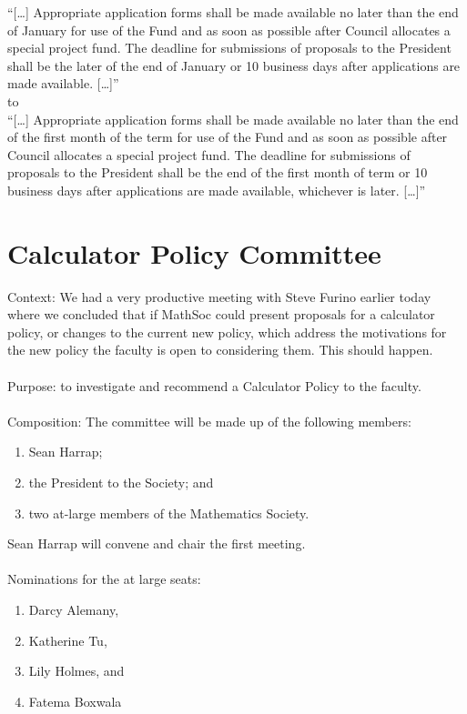\documentclass[12pt, letterpaper]{article}
\begin{document}
“[…] Appropriate application forms shall be made available no later than the end of January for use of the Fund and as soon as possible after Council allocates a special project fund. The deadline for submissions of proposals to the President shall be the later of the end of January or 10 business days after applications are made available. […]”\\

to\\

“[…] Appropriate application forms shall be made available no later than the end of the first month of the term for use of the Fund and as soon as possible after Council allocates a special project fund. The deadline for submissions of proposals to the President shall be the end of the first month of term or 10 business days after applications are made available, whichever is later. […]”\\

\newpage
{}
\section*{Calculator Policy Committee}
Context: We had a very productive meeting with Steve Furino earlier today where we concluded that if MathSoc could present proposals for a calculator policy, or changes to the current new policy, which address the motivations for the new policy the faculty is open to considering them. This should happen.\\\\
Purpose: to investigate and recommend a Calculator Policy to the faculty. \\\\
Composition: The committee will be made up of the following members:
\begin{enumerate}
	\item Sean Harrap;
	\item the President to the Society; and
	\item two at-large members of the Mathematics Society. 
\end{enumerate}
Sean Harrap will convene and chair the first meeting.\\\\
Nominations for the at large seats:
\begin{enumerate}
	\item Darcy Alemany, 
	\item Katherine Tu, 
	\item Lily Holmes, and 
	\item Fatema Boxwala
\end{enumerate}
\end{document}
